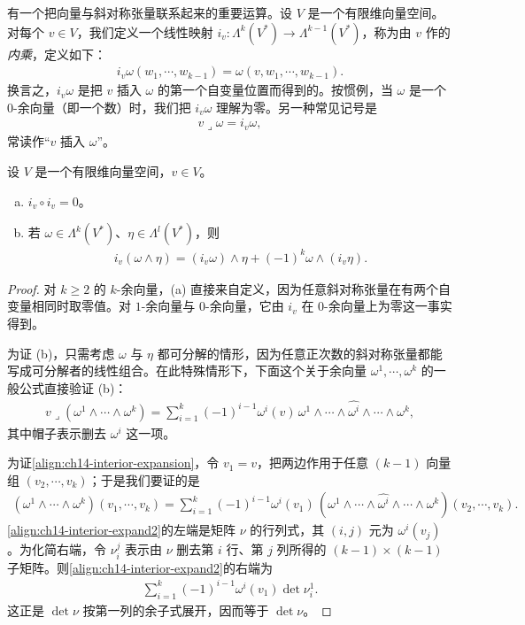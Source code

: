 \documentclass[../../main.tex]{subfiles}
\begin{document}
有一个把向量与斜对称张量联系起来的重要运算。设 $V$ 是一个有限维向量空间。对每个 $v\in V$，我们定义一个线性映射 $i_v:\Lambda^k(V^*)\to\Lambda^{k-1}(V^*)$，称为由 $v$ 作的\emph{内乘}，定义如下：
\begin{align*}
i_v\omega(w_1,\cdots ,w_{k-1})=\omega(v,w_1,\cdots ,w_{k-1}).
\end{align*}
换言之，$i_v\omega$ 是把 $v$ 插入 $\omega$ 的第一个自变量位置而得到的。按惯例，当 $\omega$ 是一个 $0$-余向量（即一个数）时，我们把 $i_v\omega$ 理解为零。另一种常见记号是
\begin{align*}
v\lrcorner\omega=i_v\omega,
\end{align*}
常读作“$v$ 插入 $\omega$”。

\begin{lemma}\label{lemma:ch14-interior}
设 $V$ 是一个有限维向量空间，$v\in V$。
\begin{enumerate}[(a)]
\item $i_v\circ i_v=0$。
\item 若 $\omega\in\Lambda^k(V^*)$、$\eta\in\Lambda^l(V^*)$，则
\begin{align}
i_v(\omega\wedge\eta)=(i_v\omega)\wedge\eta+(-1)^k\omega\wedge(i_v\eta).\label{align:ch14-interior-deriv}
\end{align}
\end{enumerate}
\end{lemma}

\begin{proof}
对 $k\geqslant2$ 的 $k$-余向量，(a) 直接来自定义，因为任意斜对称张量在有两个自变量相同时取零值。对 $1$-余向量与 $0$-余向量，它由 $i_v$ 在 $0$-余向量上为零这一事实得到。

为证 (b)，只需考虑 $\omega$ 与 $\eta$ 都可分解的情形，因为任意正次数的斜对称张量都能写成可分解者的线性组合。在此特殊情形下，下面这个关于余向量 $\omega^1,\cdots ,\omega^k$ 的一般公式直接验证 (b)：
\begin{align}
v\lrcorner(\omega^1\wedge\cdots\wedge\omega^k)
=\sum_{i=1}^k(-1)^{i-1}\omega^i(v)\,\omega^1\wedge\cdots\wedge\widehat{\omega^i}\wedge\cdots\wedge\omega^k,\label{align:ch14-interior-expansion}
\end{align}
其中帽子表示删去 $\omega^i$ 这一项。

为证\eqref{align:ch14-interior-expansion}，令 $v_1=v$，把两边作用于任意 $(k-1)$ 向量组 $(v_2,\cdots ,v_k)$；于是我们要证的是
\begin{align}
(\omega^1\wedge\cdots\wedge\omega^k)(v_1,\cdots ,v_k)
=\sum_{i=1}^k(-1)^{i-1}\omega^i(v_1)\,
(\omega^1\wedge\cdots\wedge\widehat{\omega^i}\wedge\cdots\wedge\omega^k)(v_2,\cdots ,v_k).\label{align:ch14-interior-expand2}
\end{align}
\eqref{align:ch14-interior-expand2}的左端是矩阵 $\nu$ 的行列式，其 $(i,j)$ 元为 $\omega^i(v_j)$。为化简右端，令 $\nu^j_i$ 表示由 $\nu$ 删去第 $i$ 行、第 $j$ 列所得的 $(k-1)\times(k-1)$ 子矩阵。则\eqref{align:ch14-interior-expand2}的右端为
\begin{align*}
\sum_{i=1}^k(-1)^{i-1}\omega^i(v_1)\det\nu^1_i.
\end{align*}
这正是 $\det\nu$ 按第一列的余子式展开，因而等于 $\det\nu$。
\end{proof}
\end{document}

